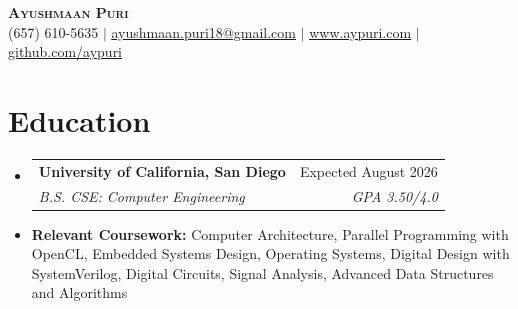 \documentclass[letterpaper,11pt]{article}
\makeatletter
\newcommand{\resumeItem}[1]{
  \item\small{
    {#1 \vspace{-2pt}}
  }
}
\newcommand{\resumeSubheading}[4]{
  \vspace{-2pt}\item
    \begin{tabular*}{0.97\textwidth}[t]{l@{\extracolsep{\fill}}r}
      \textbf{#1} & #2 \\
      \textit{\small#3} & \textit{\small #4} \\
    \end{tabular*}\vspace{-8pt}
}
\newcommand{\resumeSubHeadingListStart}{\begin{itemize}[leftmargin=0.15in, label={}]}
\newcommand{\resumeSubHeadingListEnd}{\end{itemize}}
\makeatother
\begin{document}
\begin{center}
    \textbf{\huge \scshape Ayushmaan Puri} \\ \vspace{1pt}
    \small (657) 610-5635 $|$ \href{mailto:ayushmaan.puri18@gmail.com}{\underline{ayushmaan.puri18@gmail.com}} $|$ 
    \href{https://www.aypuri.com}{\underline{www.aypuri.com}} $|$
    \href{https://github.com/aypuri}{\underline{github.com/aypuri}}
\end{center}
\vspace{-25pt}
\section{Education}
  \resumeSubHeadingListStart
    \resumeSubheading
      {University of California, San Diego}{Expected August 2026}
      {B.S. CSE: Computer Engineering}{GPA 3.50/4.0}
            \resumeItem{{\footnotesize \textbf{Relevant Coursework:} Computer Architecture, Parallel Programming with OpenCL, Embedded Systems Design, Operating Systems, Digital Design with SystemVerilog, Digital Circuits, Signal Analysis, Advanced Data Structures and Algorithms}}
  \resumeSubHeadingListEnd

\end{document}
